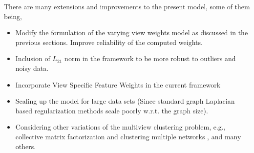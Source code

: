 \documentclass[a4paper]{article}
\begin{document}
	There are many extensions and improvements to the present model, some of them being,
	\begin{itemize}
		\item Modify the formulation of the varying view weights model as discussed in the previous sections. Improve reliability of the computed weights.
		\item Inclusion of $L_{21}$ norm in the framework to be more robust to outliers and noisy data.
		\item Incorporate View Specific Feature Weights in the current framework
		\item Scaling up the model for large data sets (Since standard graph Laplacian based regularization methods scale poorly w.r.t. the graph size).
		\item Considering other variations of the multiview clustering problem, e.g., collective matrix factorization \cite{SOME} and clustering multiple networks \cite{SPM}, and many others.	
	\end{itemize}		
	
	
	
\end{document}
